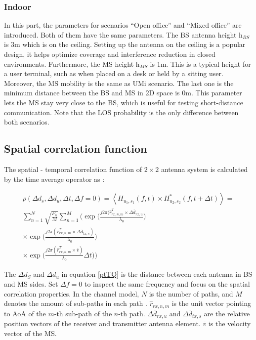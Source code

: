 \documentclass{article} %
\begin{document}
\subsubsection{Indoor}
In this part, the parameters for scenarios “Open office” and “Mixed office” are introduced. Both of them have the same parameters. The BS antenna height $\mathrm{h}_{BS}$ is 3m which is on the ceiling. Setting up the antenna on the ceiling is a popular design, it helps optimize coverage and interference reduction in closed environments. Furthermore, the MS height $\mathrm{h}_{MS}$ is 1m. This is a typical height for a user terminal, such as when placed on a desk or held by a sitting user. Moreover, the MS mobility is the same as UMi scenario. The last one is the minimum distance between the BS and MS in 2D space is 0m. This parameter lets the MS stay very close to the BS, which is useful for testing short-distance communication. Note that the LOS probability is the only difference between both scenarios. \cite{ETSI5G}


\subsection{Spatial correlation function}

The spatial - temporal correlation function of $2 \times 2$ antenna system is calculated by the time average operator as \cite{final_exam}:

\begin{adjustwidth}{-2cm}{0cm}
\begin{equation} \label{ptTQ}
\begin{split}
    \rho(\Delta d_s, \Delta d_u, \Delta t, \Delta f = 0)=\left\langle H_{u_1, s_1}(f,t) \times H_{u_2, s_2}^* (f,t+\Delta t) \right\rangle = \\
    \sum_{n=1}^{N}\sqrt{\frac{P_n}{M}}\sum_{n=1}^M
    \Bigg(
    \exp \Big( \frac{j2\pi(\hat{r}_{rx,n,m}^T \times \Delta \overline d_{rx,u}}{\lambda_0} \Big) \\
    \times \exp \Big( \frac{j2\pi(\hat{r}_{rx,n,m}^T \times \Delta \overline d_{tx,s})}{\lambda_0} \Big) \\
    \times \exp \Big( \frac{j2\pi(\hat{r}_{rx,n,m}^T \times \overline{v})}{\lambda_0} \Delta t \Big)
    \Bigg)
\end{split}
\end{equation}
\end{adjustwidth}

The $\Delta d_S$ and $\Delta d_u$ in equation \ref{ptTQ} is the distance between each antenna in BS and MS sides. Set $\Delta f = 0$ to inspect the same frequency and focus on the spatial correlation properties. In the channel model, $N$ is the number of paths, and $M$ denotes the amount of sub-paths in each path \cite{scm_onering}. $\hat{r}_{rx,n,m}$ is the unit vector pointing to AoA of the $m$-th sub-path of the $n$-th path. $\Delta \overline d_{rx, u}$ and $\Delta \overline d_{tx, s}$ are the relative position vectors of the receiver and transmitter antenna element. $\overline v$ is the velocity vector of the MS.
\end{document}
